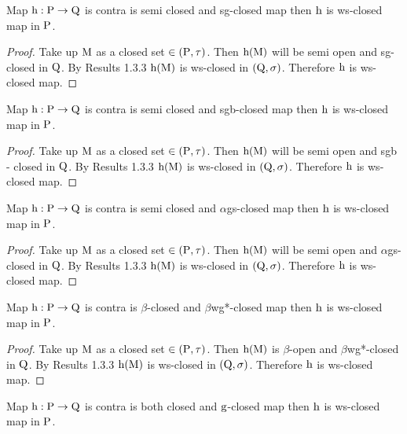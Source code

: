 \begin{thm}\label{thm4.2.21}
Map $\mathrm{h}: \mathrm{P} \to \mathrm{Q}$ is contra is semi closed and sg-closed map then $\mathrm{h}$ is ws-closed map in $\mathrm{P}$.
\end{thm}

\begin{proof}
Take up $\mathrm{M}$ as a closed set $\in(\mathrm{P}, \tau)$. Then $\mathrm{h} (\mathrm{M})$ will be semi open and sg-closed in $\mathrm{Q}$. By Results 1.3.3 $\mathrm{h} (\mathrm{M})$ is ws-closed in $(\mathrm{Q}, \sigma)$. Therefore $\mathrm{h}$ is ws-closed map.
\end{proof}

\begin{thm}\label{thm4.2.22}
Map $\mathrm{h}: \mathrm{P} \to \mathrm{Q}$ is contra is semi closed and sgb-closed map then $\mathrm{h}$ is ws-closed map in $\mathrm{P}$.
\end{thm}

\begin{proof}
Take up $\mathrm{M}$ as a closed set $\in (\mathrm{P}, \tau)$. Then $\mathrm{h}(\mathrm{M})$ will be semi open and sgb - closed in $\mathrm{Q}$. By Results 1.3.3 $\mathrm{h} (\mathrm{M})$ is ws-closed in $(\mathrm{Q}, \sigma)$. Therefore $\mathrm{h}$ is ws-closed map.
\end{proof}

\begin{thm}\label{thm4.2.23}
Map $\mathrm{h}: \mathrm{P} \to \mathrm{Q}$ is contra is semi closed and $\alpha$gs-closed map then $\mathrm{h}$ is ws-closed map in $\mathrm{P}$.
\end{thm}

\begin{proof}
Take up $\mathrm{M}$ as a closed set $\in (\mathrm{P}, \tau)$. Then $\mathrm{h} (\mathrm{M})$ will be semi open and $\alpha$gs-closed in $\mathrm{Q}$. By Results 1.3.3 $\mathrm{h} (\mathrm{M})$ is ws-closed in $(\mathrm{Q}, \sigma)$. Therefore $\mathrm{h}$ is ws-closed map.
\end{proof}

\begin{thm}\label{thm4.2.24}
Map $\mathrm{h}: \mathrm{P} \to \mathrm{Q}$ is contra is $\beta$-closed and $\beta$wg*-closed map then $\mathrm{h}$ is ws-closed map in $\mathrm{P}$.
\end{thm}

\begin{proof}
Take up $\mathrm{M}$ as a closed set $\in (\mathrm{P}, \tau)$. Then $\mathrm{h} (\mathrm{M})$ is $\beta$-open and $\beta$wg*-closed in $\mathrm{Q}$. By Results 1.3.3 $\mathrm{h} (\mathrm{M})$ is ws-closed in $(\mathrm{Q}, \sigma)$. Therefore $\mathrm{h}$ is ws-closed map.
\end{proof}

\begin{thm}\label{thm4.2.25}
Map $\mathrm{h}: \mathrm{P} \to \mathrm{Q}$ is contra is both closed and $\mathrm{g}$-closed map then $\mathrm{h}$ is ws-closed map in $\mathrm{P}$.
\end{thm}

